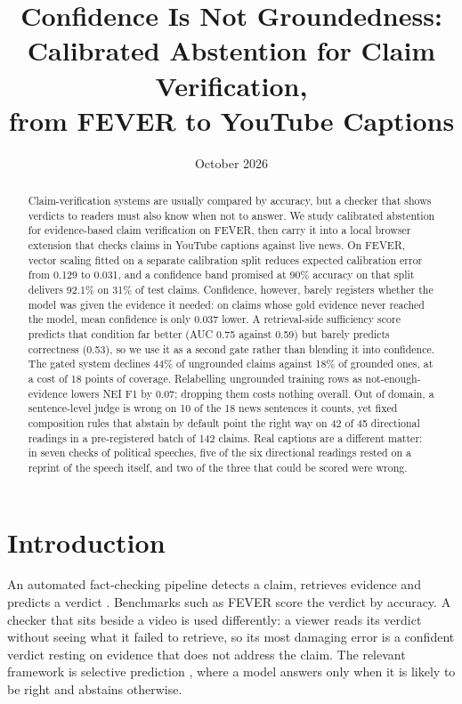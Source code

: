 \documentclass[11pt]{article}
\title{Confidence Is Not Groundedness:\\Calibrated Abstention for Claim Verification,\\from FEVER to YouTube Captions}
\author{\authorname}
\date{October 2026}
\begin{document}
\maketitle

\begin{abstract}
Claim-verification systems are usually compared by accuracy, but a checker that shows verdicts to
readers must also know when not to answer. We study calibrated abstention for evidence-based claim
verification on FEVER, then carry it into a local browser extension that checks claims in YouTube
captions against live news. On FEVER, vector scaling fitted on a separate calibration split reduces
expected calibration error from 0.129 to 0.031, and a confidence band promised at 90\% accuracy on that
split delivers 92.1\% on 31\% of test claims. Confidence, however, barely registers whether the model
was given the evidence it needed: on claims whose gold evidence never reached the model, mean confidence
is only 0.037 lower. A retrieval-side sufficiency score predicts that condition far better (AUC 0.75
against 0.59) but barely predicts correctness (0.53), so we use it as a second gate rather than blending
it into confidence. The gated system declines 44\% of ungrounded claims against 18\% of grounded ones,
at a cost of 18 points of coverage. Relabelling ungrounded training rows as not-enough-evidence lowers
NEI F1 by 0.07; dropping them costs nothing overall. Out of domain, a sentence-level judge is wrong on 10
of the 18 news sentences it counts, yet fixed composition rules that abstain by default point the right
way on 42 of 45 directional readings in a pre-registered batch of 142 claims. Real captions are a
different matter: in seven checks of political speeches, five of the six directional readings rested on a
reprint of the speech itself, and two of the three that could be scored were wrong.
\end{abstract}

\section{Introduction}

An automated fact-checking pipeline detects a claim, retrieves evidence and predicts a verdict
\citep{guo2022survey}. Benchmarks such as FEVER \citep{thorne2018fever} score the verdict by accuracy.
A checker that sits beside a video is used differently: a viewer reads its verdict without seeing what
it failed to retrieve, so its most damaging error is a confident verdict resting on evidence that does
not address the claim. The relevant framework is selective prediction \citep{elyaniv2010selective,
geifman2017selective}, where a model answers only when it is likely to be right and abstains otherwise.
\end{document}
